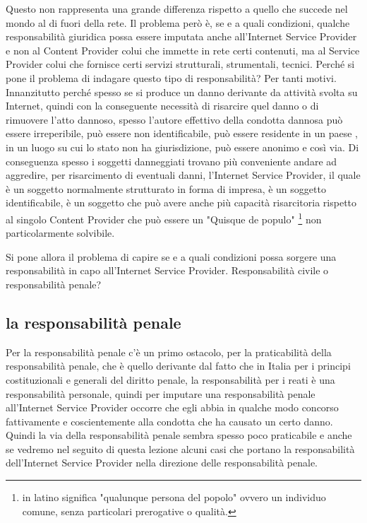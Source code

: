 Questo non rappresenta una grande differenza rispetto a quello che succede nel mondo al di fuori della rete. Il problema però è, se e a quali condizioni, qualche responsabilità giuridica possa essere imputata anche all'Internet Service Provider e non al Content Provider colui che immette in rete certi contenuti, ma al Service Provider colui che fornisce certi servizi strutturali, strumentali, tecnici. Perché si pone il problema di indagare questo tipo di responsabilità? Per tanti motivi. Innanzitutto perché spesso se si produce un danno derivante da attività svolta su Internet, quindi con la conseguente necessità di risarcire quel danno o di rimuovere l'atto dannoso, spesso l'autore effettivo della condotta dannosa può essere irreperibile, può essere non identificabile, può essere residente in un paese , in un luogo su cui lo stato non ha giurisdizione, può essere anonimo e così via. Di conseguenza spesso i soggetti danneggiati trovano più conveniente andare ad aggredire, per risarcimento di eventuali danni, l'Internet Service Provider, il quale è un soggetto normalmente strutturato in forma di impresa, è un soggetto identificabile, è un soggetto che può avere anche più capacità risarcitoria rispetto al singolo Content Provider che può essere un "Quisque de populo" \footnote{in latino significa "qualunque persona del popolo" ovvero un individuo comune, senza particolari prerogative o qualità.} non particolarmente solvibile. 

Si pone allora il problema di capire se e a quali condizioni possa sorgere una responsabilità in capo all'Internet Service Provider. Responsabilità civile o responsabilità penale? 

\subsection{la responsabilità penale}
Per la responsabilità penale c'è un primo ostacolo, per la praticabilità della responsabilità penale, che è quello derivante dal fatto che in Italia per i principi costituzionali e generali del diritto penale, la responsabilità per i reati è una responsabilità personale, quindi per imputare una responsabilità penale all'Internet Service Provider occorre che egli abbia in qualche modo concorso fattivamente e coscientemente alla condotta che ha causato un certo danno. 
Quindi la via della responsabilità penale sembra spesso poco praticabile e anche se vedremo nel seguito di questa lezione alcuni casi che portano la responsabilità dell'Internet Service Provider nella direzione delle responsabilità penale. 

